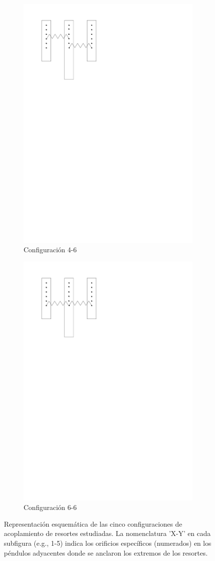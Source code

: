 \begin{figure}[htbp!]
  \begin{subfigure}[b]{0.45\textwidth} %
    \centering
    \includegraphics[width=0.6\linewidth]{./Figures/46.pdf} %
    \caption{Configuraci\'on 4-6}
    \label{fig:conf-4-6}
  \end{subfigure}
  \hfill %
  \begin{subfigure}[b]{0.45\textwidth} %
    \centering
    \includegraphics[width=0.6\linewidth]{./Figures/66.pdf} %
    \caption{Configuraci\'on 6-6}
    \label{fig:conf-6-6}
  \end{subfigure}

  \caption{Representaci\'on esquem\'atica de las cinco configuraciones de
    acoplamiento de resortes estudiadas. La nomenclatura 'X-Y' en
    cada subfigura (e.g., 1-5) indica los orificios espec\'ificos
    (numerados) en los p\'endulos adyacentes donde se anclaron
  los extremos de los resortes.}
  \label{fig:configs}
\end{figure}
